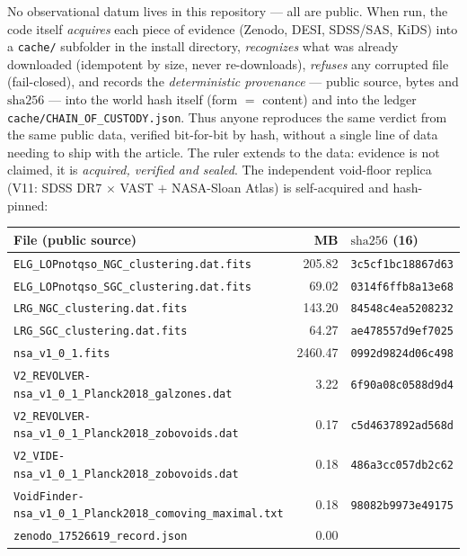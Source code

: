 \documentclass[11pt]{article}
\theoremstyle{definition}\newtheorem{deriv}{Derivation}
\begin{document}
No observational datum lives in this repository --- all are public. When run, the code itself \emph{acquires} each piece of evidence (Zenodo, DESI, SDSS/SAS, KiDS) into a \texttt{cache/} subfolder in the install directory, \emph{recognizes} what was already downloaded (idempotent by size, never re-downloads), \emph{refuses} any corrupted file (fail-closed), and records the \emph{deterministic provenance} --- public source, bytes and $\mathrm{sha}256$ --- into the world hash itself (form $=$ content) and into the ledger \texttt{cache/CHAIN\_OF\_CUSTODY.json}. Thus anyone reproduces the same verdict from the same public data, verified bit-for-bit by hash, without a single line of data needing to ship with the article. The ruler extends to the data: evidence is not claimed, it is \emph{acquired, verified and sealed}. The independent void-floor replica (V11: SDSS DR7 $\times$ VAST $+$ NASA-Sloan Atlas) is self-acquired and hash-pinned:

\begin{center}\footnotesize\begin{longtable}{@{}p{}rl@{}}\toprule File (public source) & MB & $\mathrm{sha}256$ (16) \\ \midrule\endhead \texttt{ELG\_LOPnotqso\_NGC\_clustering.dat.fits} & 205.82 & \texttt{3c5cf1bc18867d63} \\  \texttt{ELG\_LOPnotqso\_SGC\_clustering.dat.fits} & 69.02 & \texttt{0314f6ffb8a13e68} \\  \texttt{LRG\_NGC\_clustering.dat.fits} & 143.20 & \texttt{84548c4ea5208232} \\  \texttt{LRG\_SGC\_clustering.dat.fits} & 64.27 & \texttt{ae478557d9ef7025} \\  \texttt{nsa\_v1\_0\_1.fits} & 2460.47 & \texttt{0992d9824d06c498} \\  \texttt{V2\_REVOLVER-nsa\_v1\_0\_1\_Planck2018\_galzones.dat} & 3.22 & \texttt{6f90a08c0588d9d4} \\  \texttt{V2\_REVOLVER-nsa\_v1\_0\_1\_Planck2018\_zobovoids.dat} & 0.17 & \texttt{c5d4637892ad568d} \\  \texttt{V2\_VIDE-nsa\_v1\_0\_1\_Planck2018\_zobovoids.dat} & 0.18 & \texttt{486a3cc057db2c62} \\  \texttt{VoidFinder-nsa\_v1\_0\_1\_Planck2018\_comoving\_maximal.txt} & 0.18 & \texttt{98082b9973e49175} \\  \texttt{zenodo\_17526619\_record.json} & 0.00 & \texttt{} \\ \bottomrule\end{longtable}\end{center}
\end{document}
